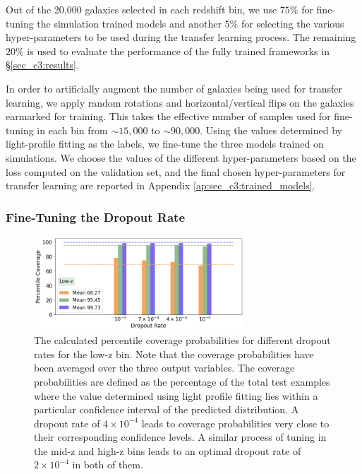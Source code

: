Out of the 20,000 galaxies selected in each redshift bin, we use $75\%$ for fine-tuning the simulation trained \gampen{} models and another $5\%$ for selecting the various hyper-parameters to be used during the transfer learning process. The remaining $20\%$ is used to evaluate the performance of the fully trained \gampen{} frameworks in \S \ref{sec_c3:results}.

In order to artificially augment the number of galaxies being used for transfer learning, we apply random rotations and horizontal/vertical flips on the galaxies earmarked for training. This takes the effective number of samples used for fine-tuning in each bin from $\sim15,000$ to $\sim90,000$. Using the values determined by light-profile fitting as the labels, we fine-tune the three \gampen{} models trained on simulations. We choose the values of the different hyper-parameters based on the loss computed on the validation set, and the final chosen hyper-parameters for transfer learning are reported in Appendix \ref{ap:sec_c3:trained_models}. 
    
\subsubsection{Fine-Tuning the Dropout Rate} \label{sec_c3:fine_tuning_dropout}

\begin{figure}[htb]
    \centering
    \includegraphics[width = 0.7\textwidth]{dropout_calibration.png}
    \caption{The calculated percentile coverage probabilities for different dropout rates for the low-z bin. Note that the coverage probabilities have been averaged over the three output variables. The coverage probabilities are defined as the percentage of the total test examples where the value determined using light profile fitting lies  within  a  particular confidence interval of the predicted distribution. A dropout rate of $4\times10^{-4}$ leads to coverage probabilities very close to their corresponding confidence levels. A similar process of tuning in the mid-z and high-z bins leads to an optimal dropout rate of $2\times10^{-4}$ in both of them.}
    \label{fig_c3:dropout_calibration}
\end{figure}

